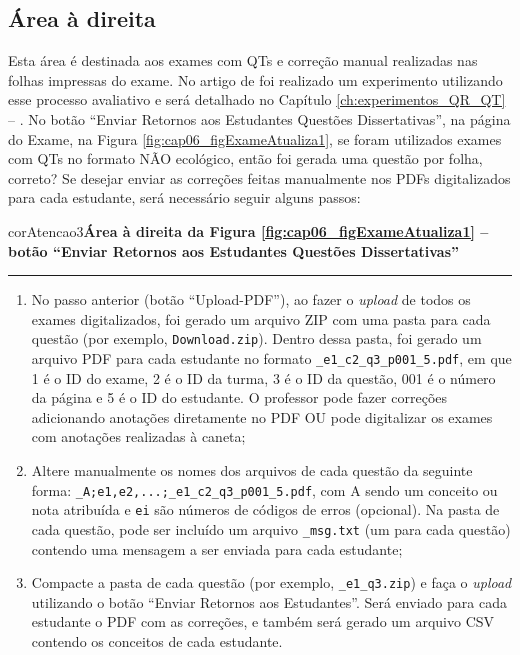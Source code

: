 \subsection{Área à direita}\label{sec:areaDireita}

Esta área é destinada aos exames com QTs e correção manual realizadas nas folhas impressas do exame. No artigo de  foi realizado um experimento utilizando esse processo avaliativo e será detalhado no Capítulo \ref{ch:experimentos_QR_QT} -- . No botão ``Enviar Retornos aos Estudantes Questões Dissertativas'', na página do Exame, na Figura \ref{fig:cap06_figExameAtualiza1}, se foram utilizados exames com QTs no formato NÃO ecológico, então foi gerada uma questão por folha, correto? Se desejar enviar as correções feitas manualmente nos PDFs digitalizados para cada estudante, será necessário seguir alguns passos:

\begin{mybox}{corAtencao3}{\textbf{Área à direita da Figura \ref{fig:cap06_figExameAtualiza1} -- botão ``Enviar Retornos aos Estudantes Questões Dissertativas''}}\\\vspace{-3mm}\hrule\vspace{1mm}
\begin{enumerate}[itemsep=-1mm]
    \item No passo anterior (botão ``Upload-PDF''), ao fazer o \textit{upload} de todos os exames digitalizados, foi gerado um arquivo ZIP com uma pasta para cada questão (por exemplo, \verb|Download.zip|). Dentro dessa pasta, foi gerado um arquivo PDF para cada estudante no formato \verb|_e1_c2_q3_p001_5.pdf|, em que 1 é o ID do exame, 2 é o ID da turma, 3 é o ID da questão, 001 é o número da página e 5 é o ID do estudante. O professor pode fazer correções adicionando anotações diretamente no PDF OU pode digitalizar os exames com anotações realizadas à caneta;    
    \item Altere manualmente os nomes dos arquivos de cada questão da seguinte forma: \verb|_A;e1,e2,...;_e1_c2_q3_p001_5.pdf|, com A sendo um conceito ou nota atribuída e \verb|ei| são números de códigos de erros (opcional). Na pasta de cada questão, pode ser incluído um arquivo \verb|_msg.txt| (um para cada questão) contendo uma mensagem a ser enviada para cada estudante;
    \item Compacte a pasta de cada questão (por exemplo, \verb|_e1_q3.zip|) e faça o \textit{upload} utilizando o botão ``Enviar Retornos aos Estudantes''. Será enviado para cada estudante o PDF com as correções, e também será gerado um arquivo CSV contendo os conceitos de cada estudante.
\end{enumerate}
\end{mybox}


